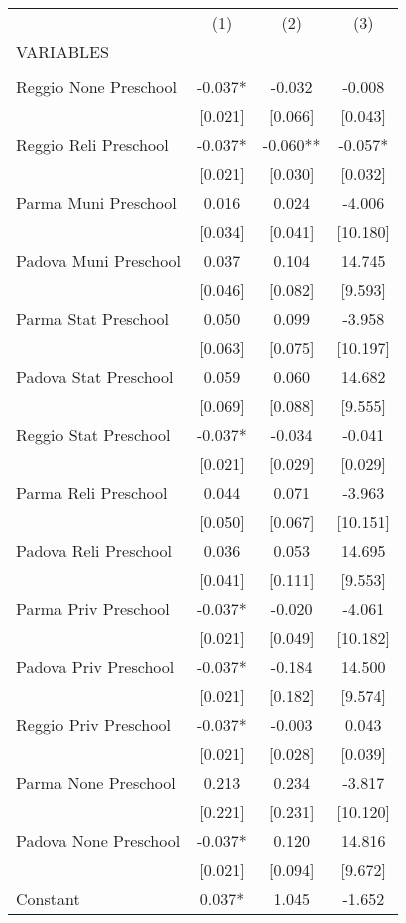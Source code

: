 \begin{tabular}{lccc} \hline
 & (1) & (2) & (3) \\
VARIABLES &  &  &  \\ \hline
 &  &  &  \\
Reggio None Preschool & -0.037* & -0.032 & -0.008 \\
 & [0.021] & [0.066] & [0.043] \\
Reggio Reli Preschool & -0.037* & -0.060** & -0.057* \\
 & [0.021] & [0.030] & [0.032] \\
Parma Muni Preschool & 0.016 & 0.024 & -4.006 \\
 & [0.034] & [0.041] & [10.180] \\
Padova Muni Preschool & 0.037 & 0.104 & 14.745 \\
 & [0.046] & [0.082] & [9.593] \\
Parma Stat Preschool & 0.050 & 0.099 & -3.958 \\
 & [0.063] & [0.075] & [10.197] \\
Padova Stat Preschool & 0.059 & 0.060 & 14.682 \\
 & [0.069] & [0.088] & [9.555] \\
Reggio Stat Preschool & -0.037* & -0.034 & -0.041 \\
 & [0.021] & [0.029] & [0.029] \\
Parma Reli Preschool & 0.044 & 0.071 & -3.963 \\
 & [0.050] & [0.067] & [10.151] \\
Padova Reli Preschool & 0.036 & 0.053 & 14.695 \\
 & [0.041] & [0.111] & [9.553] \\
Parma Priv Preschool & -0.037* & -0.020 & -4.061 \\
 & [0.021] & [0.049] & [10.182] \\
Padova Priv Preschool & -0.037* & -0.184 & 14.500 \\
 & [0.021] & [0.182] & [9.574] \\
Reggio Priv Preschool & -0.037* & -0.003 & 0.043 \\
 & [0.021] & [0.028] & [0.039] \\
Parma None Preschool & 0.213 & 0.234 & -3.817 \\
 & [0.221] & [0.231] & [10.120] \\
Padova None Preschool & -0.037* & 0.120 & 14.816 \\
 & [0.021] & [0.094] & [9.672] \\
Constant & 0.037* & 1.045 & -1.652 \\

\end{tabular}
